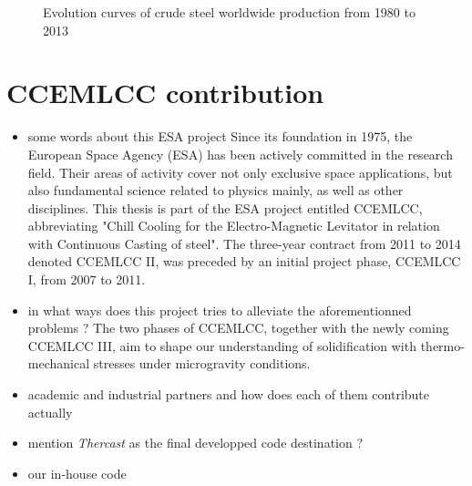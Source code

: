 \begin{figure}[!h]
\centering
{}
\caption{Evolution curves of crude steel worldwide production from 1980 to 2013}
\label{fig:steel_production}
\end{figure}


\section*{CCEMLCC contribution}
\begin{itemize}
\item some words about this ESA project
Since its foundation in 1975, the European Space Agency (ESA) has been actively committed in the research field.
Their areas of activity cover not only exclusive space applications, but also fundamental science related to 
physics mainly, as well as other disciplines. This thesis is part of the ESA project entitled CCEMLCC, abbreviating
"Chill Cooling for the Electro-Magnetic Levitator in relation with Continuous Casting of steel". 
The three-year contract from 2011 to 2014 denoted CCEMLCC II, was preceded by an initial project phase, CCEMLCC I,
from 2007 to 2011.

\item in what ways does this project tries to alleviate the aforementionned problems ?
The two phases of CCEMLCC, together with the newly coming CCEMLCC III, aim to shape our understanding
of solidification with thermo-mechanical stresses under microgravity conditions.

\item academic and industrial partners and how does each of them contribute actually
\item mention \emph{Thercast} as the final developped code destination ?
\item \cimlib our in-house code
\end{itemize}

